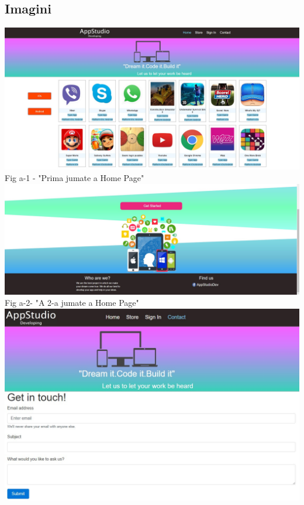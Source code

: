\subsection{Imagini}
\begin{center}
\vspace{30 mm}
\includegraphics[scale=0.37]{1sthalfwebsite} \\ 
Fig a-1 - "Prima jumate a Home Page" \\
\vspace{10 mm}
\includegraphics[scale=0.37]{2ndhalfwebsite} \\
Fig a-2- "A 2-a jumate a Home Page" \\
\vspace{10 mm}
\includegraphics[scale=0.62]{contact} \\

\end{center}
